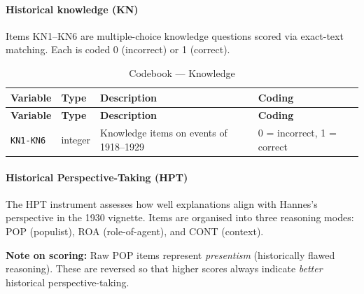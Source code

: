 \documentclass[11pt,a4paper]{article}
\begin{document}
\paragraph{Historical knowledge (KN)}
Items KN1--KN6 are multiple-choice knowledge questions scored via exact-text matching. Each is coded 0 (incorrect) or 1 (correct).
{\small
\begin{longtable}{p{3cm} p{1.5cm} p{5.5cm} p{4cm}}
\caption{Codebook --- Knowledge}\\
\toprule
\textbf{Variable} & \textbf{Type} & \textbf{Description} & \textbf{Coding}\\
\midrule
\endfirsthead
\toprule
\textbf{Variable} & \textbf{Type} & \textbf{Description} & \textbf{Coding}\\
\midrule
\endhead
\bottomrule
\endfoot

\texttt{KN1-KN6}  & integer & Knowledge items on events of 1918--1929 & 0 = incorrect, 1 = correct \\
\end{longtable}
}

\paragraph{Historical Perspective-Taking (HPT)}
The HPT instrument assesses how well explanations align with Hannes's perspective in the 1930 vignette. Items are organised into three reasoning modes: POP (populist), ROA (role-of-agent), and CONT (context). 

\textbf{Note on scoring:} Raw POP items represent \textit{presentism} (historically flawed reasoning). These are reversed so that higher scores always indicate \textit{better} historical perspective-taking.
\end{document}
